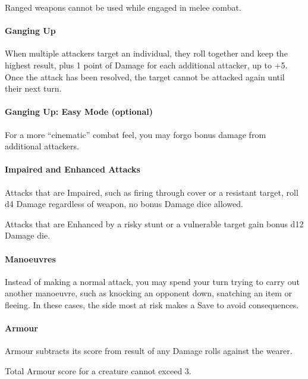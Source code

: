\documentclass[itdr]{subfiles}
\begin{document}
Ranged weapons cannot be used while engaged in melee combat.

\vfill
\paragraph{Ganging Up}
When multiple attackers target an individual, they roll together and keep the highest result, plus 1 point of Damage for each additional attacker, up to +5. Once the attack has been resolved, the target cannot be attacked again until their next turn.

\begin{dbox}
\paragraph{Ganging Up: Easy Mode (optional)}
For a more ``cinematic'' combat feel, you may forgo bonus damage from additional attackers.
\end{dbox}
\vfill
\break

\paragraph{Impaired and Enhanced Attacks}
Attacks that are Impaired, such as firing through cover or a resistant target, roll d4 Damage regardless of weapon, no bonus Damage dice allowed.

Attacks that are Enhanced by a risky stunt or a vulnerable target gain bonus d12 Damage die.

\vfill
\paragraph{Manoeuvres}
Instead of making a normal attack, you may spend your turn trying to carry out another manoeuvre, such as knocking an opponent down, snatching an item or fleeing. In these cases, the side most at risk makes a Save to avoid consequences.

\vfill
\paragraph{Armour}
Armour subtracts its score from result of any Damage rolls against the wearer.

Total Armour score for a creature cannot exceed 3.
\end{document}
